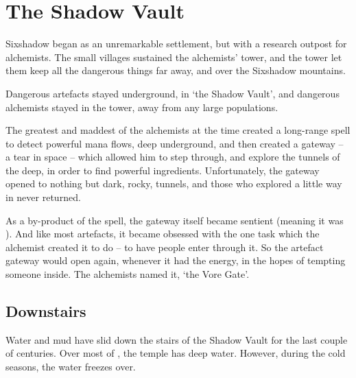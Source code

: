 \section[Shadow Vault]{The Shadow Vault}
\label{shadowVault}

\begin{multicols}{2}


\begin{exampletext}
  \noindent
  Sixshadow began as an unremarkable settlement, but with a research outpost for alchemists.
  The small \glspl{village} sustained the alchemists' tower, and the tower let them keep all the dangerous things far away, and over the Sixshadow mountains.

  Dangerous \glspl{artefact} stayed underground, in `the Shadow Vault', and dangerous alchemists stayed in the tower, away from any large populations.

  The greatest and maddest of the alchemists at the time created a long-range spell to detect powerful mana flows, deep underground, and then created a gateway -- a tear in space -- which allowed him to step through, and explore the tunnels of the \gls{deep}, in order to find powerful \glspl{ingredient}.
  Unfortunately, the gateway opened to nothing but dark, rocky, tunnels, and those who explored a little way in never returned.

  As a by-product of the spell, the gateway itself became sentient (meaning it was ).
  And like most \glspl{artefact}, it became obsessed with the one task which the alchemist created it to do -- to have people enter through it.
  So the \gls{artefact} gateway would open again, whenever it had the energy, in the hopes of tempting someone inside.
  The alchemists named it, `the Vore Gate'.
\end{exampletext}

\subsection[\glsfmttext{curiosity}~Downstairs~\glsfmttext{poison}]{Downstairs}


\begin{exampletext}
  Water and mud have slid down the stairs of the Shadow Vault for the last couple of centuries.
  Over most of , the temple has deep water.
  However, during the cold seasons, the water freezes over.
\end{exampletext}


\end{multicols}
